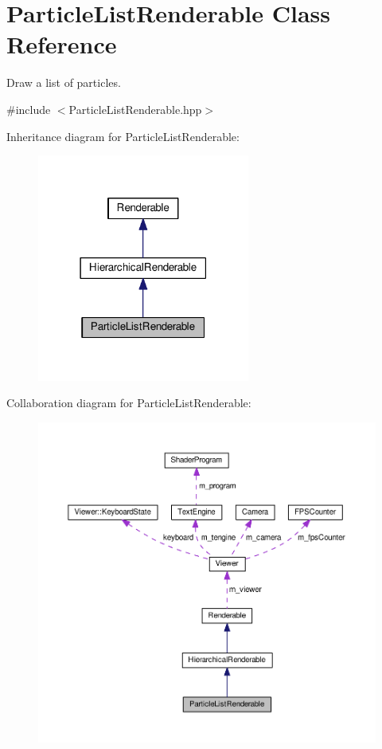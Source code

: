 \hypertarget{classParticleListRenderable}{\section{Particle\+List\+Renderable Class Reference}
\label{classParticleListRenderable}
}


Draw a list of particles.  




{\ttfamily \#include $<$Particle\+List\+Renderable.\+hpp$>$}



Inheritance diagram for Particle\+List\+Renderable\+:\nopagebreak
\begin{figure}[H]
\begin{center}
\leavevmode
\includegraphics[width=198pt]{classParticleListRenderable__inherit__graph}
\end{center}
\end{figure}


Collaboration diagram for Particle\+List\+Renderable\+:\nopagebreak
\begin{figure}[H]
\begin{center}
\leavevmode
\includegraphics[width=350pt]{classParticleListRenderable__coll__graph}
\end{center}
\end{figure}

